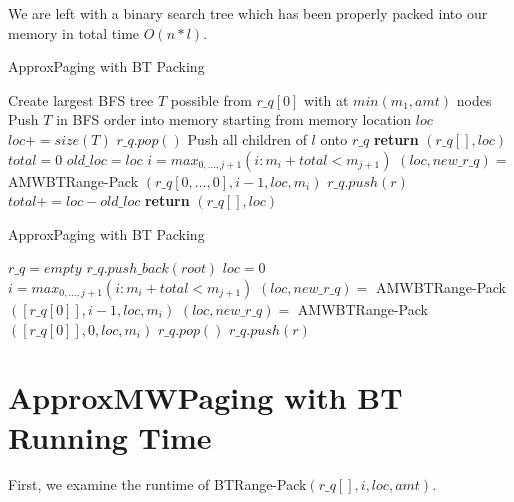 \documentclass[letterpaper,12pt,titlepage,oneside,final]{book}
\theoremstyle{plain}
\begin{document}
We are left with a binary search tree which has been properly packed into our memory in total time $O(n * l)$.


\begin{algorithm}[H]
\caption{ApproxPaging with BT Packing}
\label{AMWBTPack}
\begin{algorithmic}[1]
	\State Create largest BFS tree $T$ possible from $r\_q[0]$ with at $min(m_1, amt)$ nodes
	\State Push $T$ in BFS order into memory starting from memory location $loc$
	\State $loc += size(T)$
	\State $r\_q.pop()$
		\State Push all children of $l$ onto $r\_q$
	\EndFor
	\State \textbf{return} $(r\_q[], loc)$		
\Else
	\State $total = 0$
		\State $old\_loc = loc$
		\State $i = max_{0,...,j+1}(i : m_i + total < m_{j+1})$
		\State $(loc, new\_r\_q) =$ AMWBT\textendash Range-Pack $(r\_q[0,...,0], i-1, loc, m_i)$
			\State $r\_q.push(r)$
		\EndFor
		\State $total += loc-old\_loc$
	\EndWhile
	\State \textbf{return} $(r\_q[], loc)$
\EndIf
\EndProcedure
\end{algorithmic}
\end{algorithm}

\begin{algorithm}[H]
\caption{ApproxPaging with BT Packing}
\label{AMWBTPack}
\begin{algorithmic}[1]
\State $r\_q = empty$
\State $r\_q.push\_back(root)$
\State $loc = 0$
			\State $i = max_{0,...,j+1}(i : m_i + total < m_{j+1})$
			\State $(loc, new\_r\_q) =$ AMWBT\textendash Range-Pack $([r\_q[0]], i-1, loc, m_i)$		
		\Else
			\State $(loc, new\_r\_q) =$ AMWBT\textendash Range-Pack $([r\_q[0]], 0, loc, m_i)$
		\EndIf
		\State $r\_q.pop()$
			\State $r\_q.push(r)$
		\EndFor
	\EndWhile
\EndFor
\EndProcedure
\end{algorithmic}
\end{algorithm}


\section{ApproxMWPaging with BT Running Time }

First, we examine the runtime of BT\textendash Range-Pack$(r\_q[], i, loc, amt)$.
\end{document}
